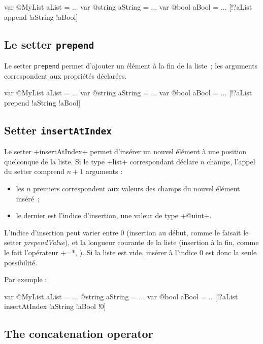 \begin{galgas}
var @MyList aList = ... 
var @string aString = ... 
var @bool aBool = ... 
[!?aList append !aString !aBool]
\end{galgas}


\subsection{Le setter \texttt{prepend}}

Le setter \texttt{prepend} permet d'ajouter un élément à la fin de la liste~; les arguments correspondent aux propriétés déclarées.

\begin{galgas}
var @MyList aList = ...
var @string aString = ...
var @bool aBool = ...
[!?aList prepend !aString !aBool]
\end{galgas}




\subsection{Setter \texttt{insertAtIndex}}

Le setter \ggs+insertAtIndex+ permet d'insérer un nouvel élément à une position quelconque de la liste. Si le type \ggs+list+ correspondant déclare $n$ champs, l'appel du setter comprend $n+1$ arguments :
\begin{itemize}
  \item les $n$ premiers correspondent aux valeurs des champs du nouvel élément inséré~;
  \item le dernier est l'indice d'insertion, une valeur de type \ggs+@uint+.
\end{itemize}

L'indice d'insertion peut varier entre $0$ (insertion au début, comme le faisait le setter \emph{prependValue}), et la longueur courante de la liste (insertion à la fin, comme le fait l'opérateur \ggs*+=*, ). Si la liste est vide, insérer à l'indice $0$ est donc la seule possibilité.

Par exemple :

\begin{galgas}
var @MyList aList = ...
@string aString = ...
var @bool aBool = ..
[!?aList insertAtIndex !aString !aBool !0]
\end{galgas}

\subsection{The concatenation operator}

